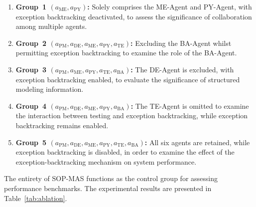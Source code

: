 \documentclass[preprint,12pt]{elsarticle}
\begin{document}
\begin{enumerate}[label=\arabic*)]
    \item \textbf{Group~1 $(a_\text{ME}, a_\text{PY})$:} Solely comprises the ME-Agent and PY-Agent, with exception backtracking deactivated, to assess the significance of collaboration among multiple agents.

    \item \textbf{Group~2 $(a_\text{PM}, a_\text{DE}, a_\text{ME}, a_\text{PY}, a_\text{TE})$:} Excluding the BA-Agent whilst permitting exception backtracking to examine the role of the BA-Agent.

    \item \textbf{Group~3 $(a_\text{PM}, a_\text{ME}, a_\text{PY}, a_\text{TE}, a_\text{BA})$:} The DE-Agent is excluded, with exception backtracking enabled, to evaluate the significance of structured modeling information.

    \item \textbf{Group~4 $(a_\text{PM}, a_\text{DE}, a_\text{ME}, a_\text{PY}, a_\text{BA})$:} The TE-Agent is omitted to examine the interaction between testing and exception backtracking, while exception backtracking remains enabled.

    \item \textbf{Group~5 $(a_\text{PM}, a_\text{DE}, a_\text{ME}, a_\text{PY}, a_\text{TE}, a_\text{BA})$:} All six agents are retained, while exception backtracking is disabled, in order to examine the effect of the exception-backtracking mechanism on system performance.
\end{enumerate}
The entirety of SOP-MAS functions as the control group for assessing performance benchmarks. The experimental results are presented in Table~\ref{tab:ablation}.
\end{document}
